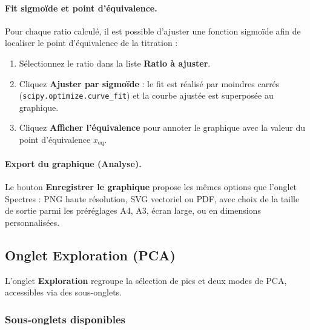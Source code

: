 \documentclass[12pt, a4paper]{article}
\begin{document}
\paragraph{Fit sigmoïde et point d'équivalence.}
Pour chaque ratio calculé, il est possible d'ajuster une fonction sigmoïde
afin de localiser le point d'équivalence de la titration :
\begin{enumerate}
  \item Sélectionnez le ratio dans la liste \textbf{Ratio à ajuster}.
  \item Cliquez \textbf{Ajuster par sigmoïde} : le fit est réalisé par
        moindres carrés (\texttt{scipy.optimize.curve\_fit}) et la courbe
        ajustée est superposée au graphique.
  \item Cliquez \textbf{Afficher l'équivalence} pour annoter le graphique
        avec la valeur du point d'équivalence $x_\text{eq}$.
\end{enumerate}

\paragraph{Export du graphique (Analyse).}
Le bouton \textbf{Enregistrer le graphique} propose les mêmes options que
l'onglet Spectres : PNG haute résolution, SVG vectoriel ou PDF, avec choix
de la taille de sortie parmi les préréglages A4, A3, écran large, ou en
dimensions personnalisées.

\subsection{Onglet Exploration (PCA)}

L'onglet \textbf{Exploration} regroupe la sélection de pics et deux modes de
PCA, accessibles via des sous-onglets.

\subsubsection{Sous-onglets disponibles}
\end{document}
